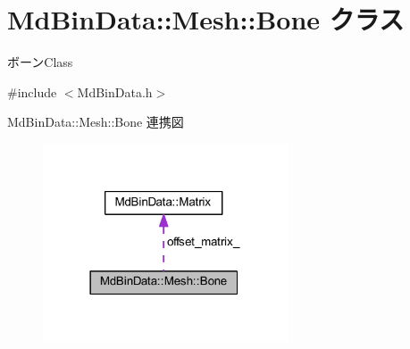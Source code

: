 \hypertarget{class_md_bin_data_1_1_mesh_1_1_bone}{}\section{Md\+Bin\+Data\+:\+:Mesh\+:\+:Bone クラス}
\label{class_md_bin_data_1_1_mesh_1_1_bone}


ボーン\+Class  




{\ttfamily \#include $<$Md\+Bin\+Data.\+h$>$}



Md\+Bin\+Data\+:\+:Mesh\+:\+:Bone 連携図\nopagebreak
\begin{figure}[H]
\begin{center}
\leavevmode
\includegraphics[width=206pt]{class_md_bin_data_1_1_mesh_1_1_bone__coll__graph}
\end{center}
\end{figure}
